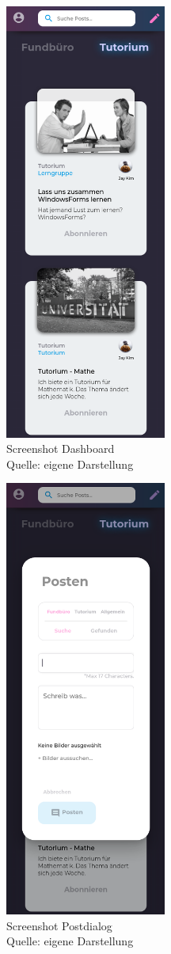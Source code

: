 \documentclass[12pt,titlepage]{article}
\begin{document}
\begin{figure}[hbt!]
\centering
\includegraphics[width=150pt]{screenshots/Screenshot_Mobil_Dashboard.png}
\caption[Sreenshot Dashboard]{Screenshot Dashboard \\Quelle: eigene Darstellung}
\end{figure}

\begin{figure}[hbt!]
\centering
\includegraphics[width=150pt]{screenshots/Screenshot_Mobil_Posten.png}
\caption[Sreenshot Postdialog]{Screenshot Postdialog\\Quelle: eigene Darstellung}
\end{figure}
\end{document}
